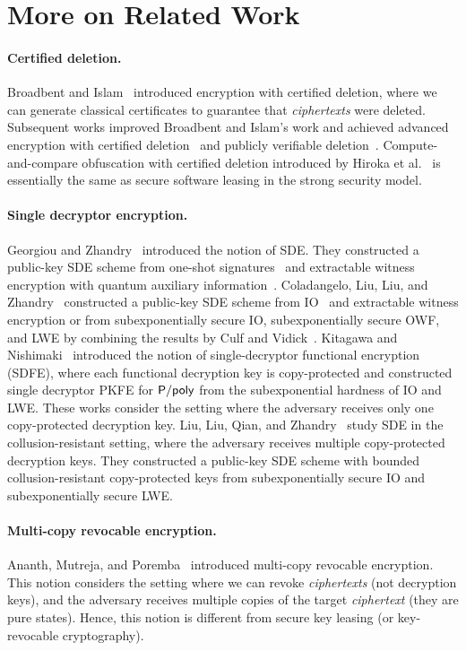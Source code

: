 
\ifnum{}
\section{More on Related Work} 
\label{sec:other-rel}
\else
\fi

\paragraph{Certified deletion.}
Broadbent and Islam~\cite{TCC:BroIsl20} introduced encryption with certified deletion, where we can generate classical certificates to guarantee that \emph{ciphertexts} were deleted. Subsequent works improved Broadbent and Islam's work and achieved advanced encryption with certified deletion~\cite{AC:HMNY21,ITCS:Poremba23,C:BarKhu23,EC:HKMNPY24,EC:BGKMRR24} and publicly verifiable deletion~\cite{AC:HMNY21,EC:BGKMRR24,TCC:KitNisYam23,TCC:BKMPW23}.
Compute-and-compare obfuscation with certified deletion introduced by Hiroka et al.~\cite{EC:HKMNPY24} is essentially the same as secure software leasing in the strong security model.

\paragraph{Single decryptor encryption.}
Georgiou and Zhandry~\cite{EPRINT:GeoZha20} introduced the notion of SDE. They constructed a public-key SDE scheme from one-shot signatures~\cite{STOC:AGKZ20} and extractable witness encryption with quantum auxiliary information~\cite{STOC:GGSW13,C:GKPVZ13}. Coladangelo, Liu, Liu, and Zhandry~\cite{C:CLLZ21} constructed a public-key SDE scheme from IO~\cite{JACM:BGIRSVY12} and extractable witness encryption or from subexponentially secure IO, subexponentially secure OWF, and LWE by combining the results by Culf and Vidick~\cite{Quantum:CulVid22}. Kitagawa and Nishimaki~\cite{AC:KitNis22} introduced the notion of single-decryptor functional encryption (SDFE), where each functional decryption key is copy-protected and constructed single decryptor PKFE for $\mathsf{P/poly}$ from the subexponential hardness of IO and LWE.
These works consider the setting where the adversary receives only one copy-protected decryption key.
Liu, Liu, Qian, and Zhandry~\cite{TCC:LLQZ22} study SDE in the collusion-resistant setting, where the adversary receives multiple copy-protected decryption keys.
They constructed a public-key SDE scheme with bounded collusion-resistant copy-protected keys from subexponentially secure IO and subexponentially secure LWE.

\paragraph{Multi-copy revocable encryption.}
Ananth, Mutreja, and Poremba~\cite{myEPRINT:AnaMutPor24} introduced multi-copy revocable encryption.
This notion considers the setting where we can revoke \emph{ciphertexts} (not decryption keys), and the adversary receives multiple copies of the target \emph{ciphertext} (they are pure states). Hence, this notion is different from secure key leasing (or key-revocable cryptography).

